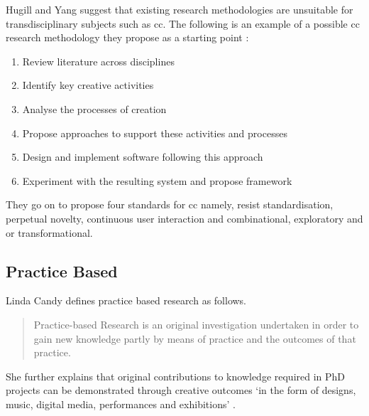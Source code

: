 \begin{draft}
  Hugill and Yang suggest that existing research methodologies are unsuitable for transdisciplinary subjects such as \gls{cc}. The following is an example of a possible \gls{cc} research methodology they propose as a starting point \autocite[p.17]{Hugill2013c}:

  \begin{enumerate}
    \item Review literature across disciplines
    \item Identify key creative activities
    \item Analyse the processes of creation
    \item Propose approaches to support these activities and processes
    \item Design and implement software following this approach
    \item Experiment with the resulting system and propose framework
  \end{enumerate}

  They go on to propose four standards for \gls{cc} \autocite[p.17]{Hugill2013c} namely, resist standardisation, perpetual novelty, continuous user interaction and combinational, exploratory and or transformational.
\end{draft}

\begin{draft}

\end{draft}

\subsection{Practice Based}

Linda Candy defines practice based research as follows.

\begin{quotation}
  Practice-based Research is an original investigation undertaken in order to gain new knowledge partly by means of practice and the outcomes of that practice. 
\end{quotation}

She further explains that original contributions to knowledge required in PhD projects can be demonstrated through creative outcomes `in the form of designs, music, digital media, performances and exhibitions' \autocite{Candy2006}.



